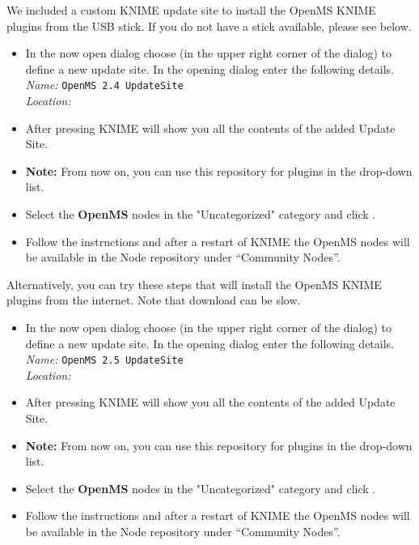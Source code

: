 We included a custom KNIME update site to install the OpenMS KNIME plugins from the USB stick. If you do not have a stick available, please see below.

\begin{itemize}
  \item \label{it:add_site} In the now open dialog choose  (in the upper right corner of the dialog) to define a new update site. In the opening dialog enter the following details. \\
  \textit{Name:} \texttt{OpenMS 2.4 UpdateSite} \\
  \textit{Location:}  \KnimeUSBUpdateSite \\
  \item \label{it:select_site} After pressing  KNIME will show you all the contents of the added Update Site.
  \item \textbf{Note:} From now on, you can use this repository for plugins in the  drop-down list.
  \item Select the \textbf{OpenMS} nodes in the "Uncategorized" category and click .
  \item Follow the instructions and after a restart of KNIME the OpenMS nodes will be available in the Node repository under “Community Nodes”.
\end{itemize}

Alternatively, you can try these steps that will install the OpenMS KNIME plugins from the internet. Note that download can be slow.

\begin{itemize}
  \item \label{it:add_site} In the now open dialog choose  (in the upper right corner of the dialog) to define a new update site. In the opening dialog enter the following details. \\
  \textit{Name:} \texttt{OpenMS 2.5 UpdateSite} \\
  \textit{Location:} 
\end{itemize}  
  \menu{\KnimeTrunkSite}
\begin{itemize}
  \item \label{it:select_site} After pressing  KNIME will show you all the contents of the added Update Site.
  \item \textbf{Note:} From now on, you can use this repository for plugins in the  drop-down list.
  \item Select the \textbf{OpenMS} nodes in the "Uncategorized" category and click .
  \item Follow the instructions and after a restart of KNIME the OpenMS nodes will be available in the Node repository under “Community Nodes”.
\end{itemize}

